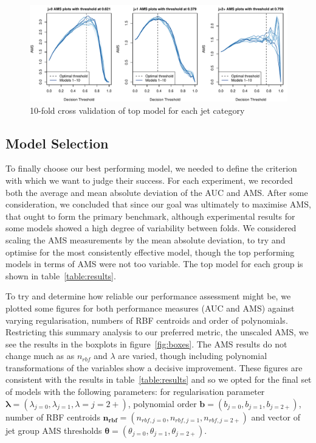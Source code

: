 \begin{figure}[htbp]
    \begin{adjustbox}{max width=1.4\linewidth,center}
    \centering
	\includegraphics[width=1.2\textwidth]{CV_LogReg_AMS}
    \end{adjustbox}
    \caption{10-fold cross validation of top model for each jet category}
    \label{fig:ams_curve}
\end{figure}


\subsection{Model Selection}
To finally choose our best performing model, we needed to define the criterion with which we want to judge their success. For each experiment, we recorded both the average and mean absolute deviation of the AUC and AMS. After some consideration, we concluded that since our goal was ultimately to maximise AMS, that ought to form the primary benchmark, although experimental results for some models showed a high degree of variability between folds. We considered scaling the AMS measurements by the mean absolute deviation, to try and optimise for the most consistently effective model, though the top performing models in terms of AMS were not too variable. The top model for each group is shown in table~\ref{table:results}. 


To try and determine how reliable our performance assessment might be, we plotted some figures for both performance measures (AUC and AMS) against varying regularisation, numbers of RBF centroids and order of polynomials. Restricting this summary analysis to our preferred metric, the unscaled AMS, we see the results in the boxplots in figure~\ref{fig:boxes}. The AMS results do not change much as as $n_{rbf}$ and $\lambda$ are varied, though including polynomial transformations of the variables show a decisive improvement. These figures are consistent with the results in table~\ref{table:results} and so we opted for the final set of models with the following parameters:
for regularisation parameter $\boldsymbol{\lambda}=(\lambda_{j=0}, \lambda_{j=1}, \lambda={j=2+})$, polynomial order $\bm{b}=(b_{j=0}, b_{j=1}, b_{j=2+})$, number of RBF centroids $\bm{n_{rbf}}=(n_{rbf,j=0}, n_{rbf,j=1}, n_{rbf,j=2+})$ and vector of jet group AMS thresholds $\bm{\theta} = (\theta_{j=0}, \theta_{j=1}, \theta_{j=2+})$.

